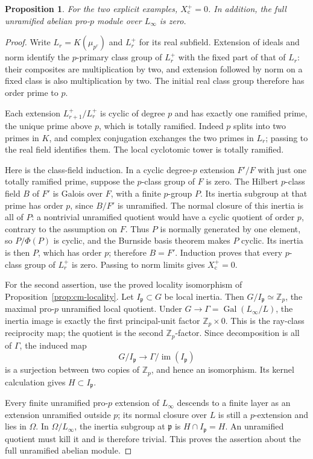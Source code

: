 \documentclass[11pt]{article}
\newtheorem{proposition}[theorem]{Proposition}
\theoremstyle{definition}\newtheorem{definition}[theorem]{Definition}
\begin{document}
\begin{proposition}\label{prop:cm-unramified-zero}
For the two explicit examples, \(X_{\mathrm c}^+=0\).
In addition, the full unramified abelian pro-\(p\)
module over \(L_\infty\) is zero.
\end{proposition}
\begin{proof}
Write \(L_r=K(\mu_{p^r})\) and \(L_r^+\) for its real
subfield. Extension of ideals and norm identify the
\(p\)-primary class group of \(L_r^+\) with the fixed
part of that of \(L_r\): their composites are multiplication
by two, and extension followed by norm on a fixed class
is also multiplication by two. The initial real class
group therefore has order prime to \(p\).

Each extension \(L_{r+1}^+/L_r^+\) is cyclic of degree
\(p\) and has exactly one ramified prime, the unique
prime above \(p\), which is totally ramified.
Indeed \(p\) splits into two primes in \(K\), and complex
conjugation exchanges the two primes in \(L_r\);
passing to the real field identifies them. The local
cyclotomic tower is totally ramified.

Here is the class-field induction. In a cyclic degree-\(p\)
extension \(F'/F\) with just one totally ramified prime,
suppose the \(p\)-class group of \(F\) is zero.
The Hilbert \(p\)-class field \(B\) of \(F'\) is Galois
over \(F\), with a finite \(p\)-group \(P\). Its inertia
subgroup at that prime has order \(p\), since \(B/F'\)
is unramified. The normal closure of this inertia is
all of \(P\): a nontrivial unramified quotient would
have a cyclic quotient of order \(p\), contrary to
the assumption on \(F\). Thus \(P\) is normally
generated by one element, so \(P/\Phi(P)\) is cyclic,
and the Burnside basis theorem makes \(P\) cyclic.
Its inertia is then \(P\), which has order \(p\);
therefore \(B=F'\). Induction proves that every
\(p\)-class group of \(L_r^+\) is zero. Passing to
norm limits gives \(X_{\mathrm c}^+=0\).

For the second assertion, use the proved locality
isomorphism of Proposition~\ref{prop:cm-locality}.
Let \(I_{\mathfrak p}\subset G\) be local inertia.
Then \(G/I_{\mathfrak p}\simeq\mathbb Z_p\), the
maximal pro-\(p\) unramified local quotient.
Under \(G\to\Gamma=\operatorname{Gal}(L_\infty/L)\),
the inertia image is exactly the first principal-unit
factor \(\mathbb Z_p\times0\). This is the ray-class
reciprocity map; the quotient is the second
\(\mathbb Z_p\)-factor. Since decomposition is all
of \(\Gamma\), the induced map
\[
 G/I_{\mathfrak p}\longrightarrow
 \Gamma/\operatorname{im}(I_{\mathfrak p})
\]
is a surjection between two copies of \(\mathbb Z_p\),
and hence an isomorphism. Its kernel calculation
gives \(H\subset I_{\mathfrak p}\).

Every finite unramified pro-\(p\) extension of
\(L_\infty\) descends to a finite layer as an extension
unramified outside \(p\); its normal closure over \(L\)
is still a \(p\)-extension and lies in \(\Omega\).
In \(\Omega/L_\infty\), the inertia subgroup at
\(\mathfrak p\) is \(H\cap I_{\mathfrak p}=H\).
An unramified quotient must kill it and is therefore
trivial. This proves the assertion about the full
unramified abelian module.
\end{proof}
\end{document}
